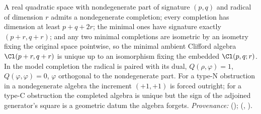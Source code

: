 A real quadratic space with nondegenerate part of signature $(p,q)$ and radical of dimension $r$ admits a nondegenerate completion; every completion has dimension at least $p + q + 2r$; the minimal ones have signature exactly $(p+r, q+r)$; and any two minimal completions are isometric by an isometry fixing the original space pointwise, so the minimal ambient Clifford algebra $\Cl(p+r, q+r)$ is unique up to an isomorphism fixing the embedded $\Cl(p,q;r)$. In the model completion the radical is paired with its dual, $Q(\rho, \varphi) = 1$, $Q(\varphi,\varphi) = 0$, $\varphi$ orthogonal to the nondegenerate part. For a type-N obstruction in a nondegenerate algebra the increment $(+1,+1)$ is forced outright; for a type-C obstruction the completed algebra is unique but the sign of the adjoined generator's square is a geometric datum the algebra forgets. \emph{Provenance:} \cite[Thm.~2.3 and its model]{ButlerT2} (); \cite[Thm.~4.13, Thm.~5.7 and Rem.~5.8]{ButlerT1} (, ).
